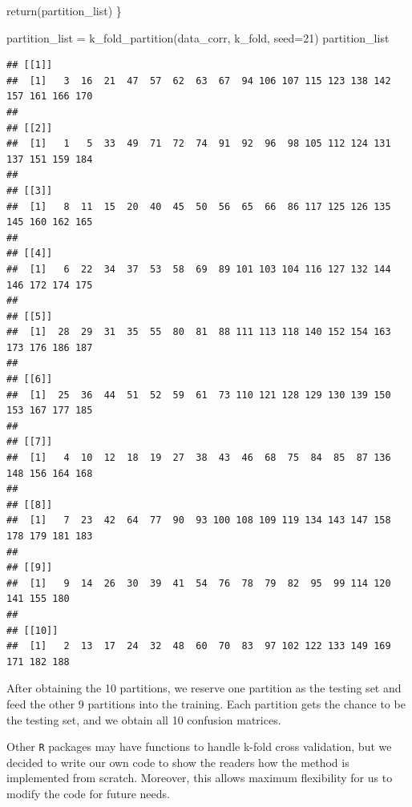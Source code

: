 \documentclass[
]{article}
\newenvironment{Shaded}{\begin{snugshade}}{\end{snugshade}}
\newcommand{\AttributeTok}[1]{\textcolor[rgb]{0.77,0.63,0.00}{#1}}
\newcommand{\DecValTok}[1]{\textcolor[rgb]{0.00,0.00,0.81}{#1}}
\newcommand{\FunctionTok}[1]{\textcolor[rgb]{0.00,0.00,0.00}{#1}}
\newcommand{\NormalTok}[1]{#1}
\newcommand{\OtherTok}[1]{\textcolor[rgb]{0.56,0.35,0.01}{#1}}
\begin{document}
\begin{Shaded}
\begin{Highlighting}[]
  \FunctionTok{return}\NormalTok{(partition\_list)}
\NormalTok{\}}

\NormalTok{partition\_list }\OtherTok{=} \FunctionTok{k\_fold\_partition}\NormalTok{(data\_corr, k\_fold, }\AttributeTok{seed=}\DecValTok{21}\NormalTok{)}
\NormalTok{partition\_list}
\end{Highlighting}
\end{Shaded}

\begin{verbatim}
## [[1]]
##  [1]   3  16  21  47  57  62  63  67  94 106 107 115 123 138 142 157 161 166 170
## 
## [[2]]
##  [1]   1   5  33  49  71  72  74  91  92  96  98 105 112 124 131 137 151 159 184
## 
## [[3]]
##  [1]   8  11  15  20  40  45  50  56  65  66  86 117 125 126 135 145 160 162 165
## 
## [[4]]
##  [1]   6  22  34  37  53  58  69  89 101 103 104 116 127 132 144 146 172 174 175
## 
## [[5]]
##  [1]  28  29  31  35  55  80  81  88 111 113 118 140 152 154 163 173 176 186 187
## 
## [[6]]
##  [1]  25  36  44  51  52  59  61  73 110 121 128 129 130 139 150 153 167 177 185
## 
## [[7]]
##  [1]   4  10  12  18  19  27  38  43  46  68  75  84  85  87 136 148 156 164 168
## 
## [[8]]
##  [1]   7  23  42  64  77  90  93 100 108 109 119 134 143 147 158 178 179 181 183
## 
## [[9]]
##  [1]   9  14  26  30  39  41  54  76  78  79  82  95  99 114 120 141 155 180
## 
## [[10]]
##  [1]   2  13  17  24  32  48  60  70  83  97 102 122 133 149 169 171 182 188
\end{verbatim}

After obtaining the 10 partitions, we reserve one partition as the
testing set and feed the other 9 partitions into the training. Each
partition gets the chance to be the testing set, and we obtain all 10
confusion matrices.

Other \texttt{R} packages may have functions to handle k-fold cross
validation, but we decided to write our own code to show the readers how
the method is implemented from scratch. Moreover, this allows maximum
flexibility for us to modify the code for future needs.
\end{document}
